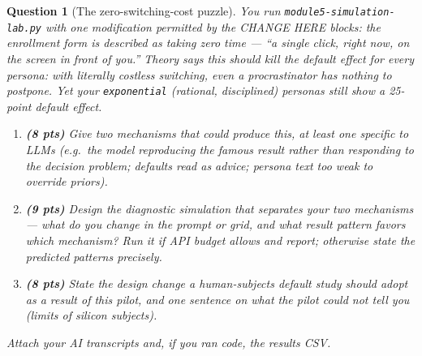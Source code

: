 \documentclass[11pt]{article}
\newtheorem{question}{Question}
\begin{document}
\begin{question}[The zero-switching-cost puzzle]
You run \texttt{module5-simulation-lab.py} with one modification permitted
by the CHANGE HERE blocks: the enrollment form is described as taking
\emph{zero} time --- ``a single click, right now, on the screen in front of
you.'' Theory says this should kill the default effect for \emph{every}
persona: with literally costless switching, even a procrastinator has
nothing to postpone. Yet your \texttt{exponential} (rational, disciplined)
personas still show a 25-point default effect.

\begin{enumerate}[label=(\alph*)]
  \item \textbf{(8 pts)} Give two mechanisms that could produce this, at
        least one specific to LLMs (e.g.\ the model reproducing the
        \emph{famous result} rather than responding to the decision problem;
        defaults read as advice; persona text too weak to override priors).
  \item \textbf{(9 pts)} Design the diagnostic simulation that separates
        your two mechanisms --- what do you change in the prompt or grid,
        and what result pattern favors which mechanism? Run it if API budget
        allows and report; otherwise state the predicted patterns precisely.
  \item \textbf{(8 pts)} State the design change a \emph{human-subjects}
        default study should adopt as a result of this pilot, and one
        sentence on what the pilot could \emph{not} tell you (limits of
        silicon subjects).
\end{enumerate}
Attach your AI transcripts and, if you ran code, the results CSV.
\end{question}
\end{document}
